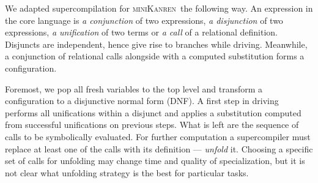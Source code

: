 \documentclass[submission,copyright,creativecommons]{eptcs}
\newcommand{\miniKanren}{\textsc{miniKanren}\ }
\begin{document}
We adapted supercompilation for \miniKanren the following way.
An expression in the core language is {\it a conjunction} of two expressions, {\it a disjunction} of two expressions, {\it a unification}
of two terms or {\it a call} of a relational definition.
Disjuncts are independent, hence give rise to branches while driving.
Meanwhile, a conjunction of relational calls alongside with a computed substitution forms a configuration.

%

Foremost, we pop all fresh variables to the top level and transform a configuration to a disjunctive normal form (DNF).
A first step in driving performs all unifications within a disjunct and applies a substitution computed
from successful unifications on previous steps.
What is left are the sequence of calls to be symbolically evaluated.
For further computation a supercompiler must replace at least one of the calls with its definition --- {\it unfold} it.
Choosing a specific set of calls for unfolding may change time and quality of specialization, but it is not clear
what unfolding strategy is the best for particular tasks.
\end{document}
